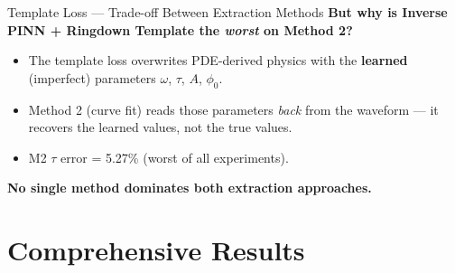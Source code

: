 \documentclass[aspectratio=169, 11pt]{beamer}
\begin{document}
\begin{frame}{Template Loss --- Trade-off Between Extraction Methods}
  \textbf{But why is Inverse PINN + Ringdown Template the \emph{worst} on Method 2?}

  \begin{itemize}
    \item The template loss overwrites PDE-derived physics with the
          \textbf{learned} (imperfect) parameters $\omega$, $\tau$, $A$, $\phi_0$.
    \item Method 2 (curve fit) reads those parameters \emph{back} from the
          waveform --- it recovers the learned values, not the true values.
    \item M2 $\tau$ error = 5.27\% (worst of all experiments).
  \end{itemize}

  \bigskip
  \begin{center}
  \end{center}

  \medskip
  \begin{center}
    \textbf{No single method dominates both extraction approaches.}
  \end{center}
\end{frame}


\section{Comprehensive Results}
\end{document}
